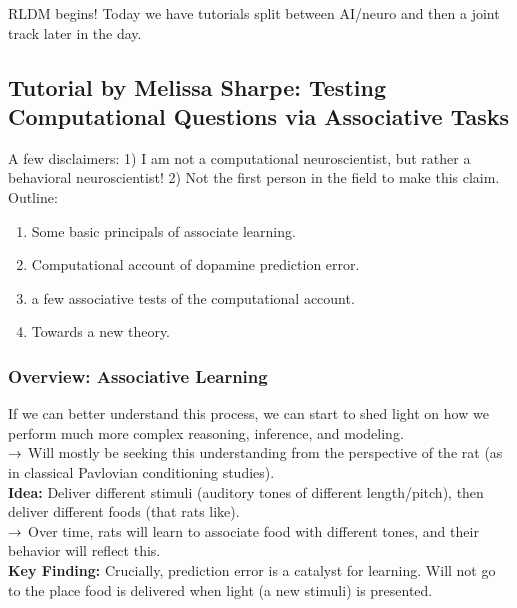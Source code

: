 RLDM begins! Today we have tutorials split between AI/neuro and then a joint track later in the day.

\subsection{Tutorial by Melissa Sharpe: Testing Computational Questions via Associative Tasks}


A few disclaimers: 1) I am not a computational neuroscientist, but rather a behavioral neuroscientist! 2) Not the first person in the field to make this claim. \\

Outline:
\begin{enumerate}
    \item Some basic principals of associate learning.
    \item Computational account of dopamine prediction error.
    \item a few associative tests of the computational account.
    \item Towards a new theory.
\end{enumerate}


\subsubsection{Overview: Associative Learning}



If we can better understand this process, we can start to shed light on how we perform much more complex reasoning, inference, and modeling. \\

$\rightarrow$ Will mostly be seeking this understanding from the perspective of the rat (as in classical Pavlovian conditioning studies). \\

{\bf Idea:} Deliver different stimuli (auditory tones of different length/pitch), then deliver different foods (that rats like). \\

$\rightarrow$ Over time, rats will learn to associate food with different tones, and their behavior will reflect this. \\

{\bf Key Finding:} Crucially, prediction error is a catalyst for learning. Will not go to the place food is delivered when light (a new stimuli) is presented. \\

